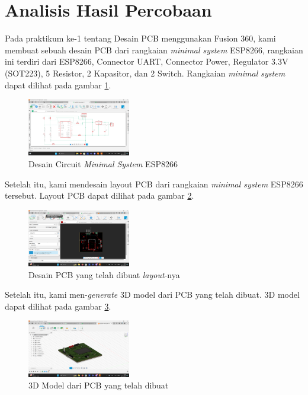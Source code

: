 \section*{Analisis Hasil Percobaan}
\indent

Pada praktikum ke-1 tentang Desain PCB menggunakan Fusion 360, kami membuat sebuah desain PCB dari rangkaian \textit{minimal system} ESP8266, rangkaian ini terdiri dari ESP8266, Connector UART, Connector Power, Regulator 3.3V (SOT223), 5 Resistor, 2 Kapasitor, dan 2 Switch. Rangkaian \textit{minimal system} dapat dilihat pada gambar \ref{fig:rawcircuit}.

\begin{figure}[htbp]
    \centering
    \includegraphics[width=0.4\textwidth]{img/raw-circuit.png}
    \caption{Desain Circuit \textit{Minimal System} ESP8266}
    \label{fig:rawcircuit}
\end{figure}

Setelah itu, kami mendesain layout PCB dari rangkaian \textit{minimal system} ESP8266 tersebut. Layout PCB dapat dilihat pada gambar \ref{fig:pcb-assembled}.

\begin{figure}[htbp]
    \centering
    \includegraphics[width=0.4\textwidth]{img/pcb-assembled.png}
    \caption{Desain PCB yang telah dibuat \textit{layout}-nya}
    \label{fig:pcb-assembled}
\end{figure}

Setelah itu, kami men-\textit{generate} 3D model dari PCB yang telah dibuat. 3D model dapat dilihat pada gambar \ref{fig:3dmodel}.

\begin{figure}[htbp]
    \centering
    \includegraphics[width=0.4\textwidth]{img/fusion360.png}
    \caption{3D Model dari PCB yang telah dibuat}
    \label{fig:3dmodel}
\end{figure}


